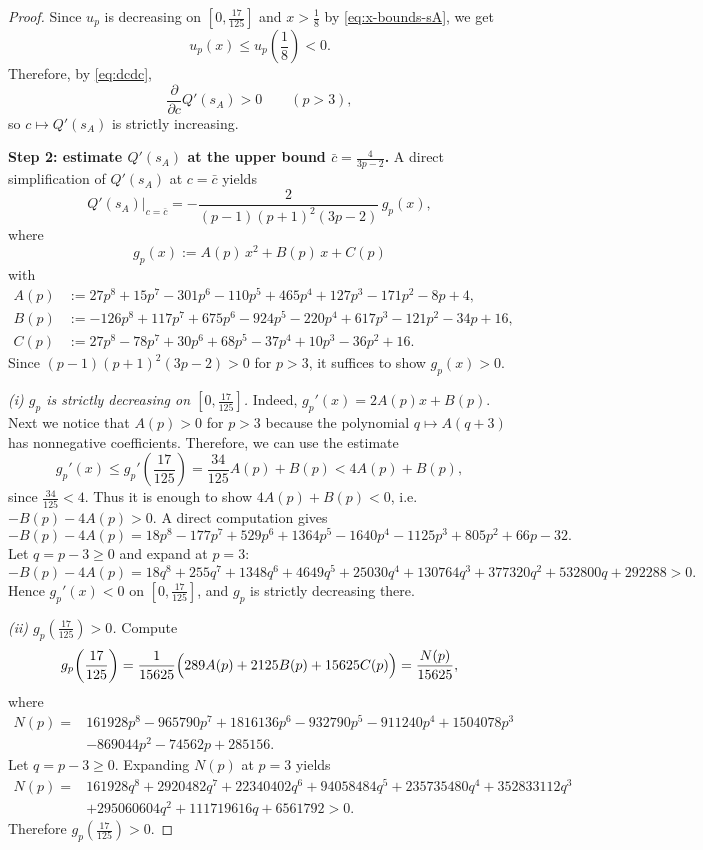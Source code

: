 \documentclass[11pt]{article}
\theoremstyle{definition}
\newcommand{\1}{\mathbf{1}}
\begin{document}
\begin{proof}
\smallskip
Since $u_p$ is decreasing on $[0,\frac{17}{125}]$ and $x>\frac18$ by \eqref{eq:x-bounds-sA}, we get
\[
u_p(x)\le u_p\!\left(\frac18\right)<0.
\]
Therefore, by \eqref{eq:dcdc},
\[
\frac{\partial}{\partial c}Q'(s_A)>0\qquad(p>3),
\]
so $c\mapsto Q'(s_A)$ is strictly increasing.

\medskip
\noindent\textbf{Step 2: estimate $Q'(s_A)$ at the upper bound $\bar c=\frac{4}{3p-2}$.}
A direct simplification of $Q'(s_A)$ at $c=\bar c$ yields
\begin{equation}\label{eq:Qprime-cbar}
Q'(s_A)\big|_{c=\bar c}
=
-\frac{2}{(p-1)(p+1)^2(3p-2)}\,g_p(x),
\end{equation}
where
\[
g_p(x):=A(p)\,x^2+B(p)\,x+C(p)
\]
with
\begin{align*}
A(p)&:=27p^8+15p^7-301p^6-110p^5+465p^4+127p^3-171p^2-8p+4,\\
B(p)&:=-126p^8+117p^7+675p^6-924p^5-220p^4+617p^3-121p^2-34p+16,\\
C(p)&:=27p^8-78p^7+30p^6+68p^5-37p^4+10p^3-36p^2+16.
\end{align*}
Since $(p-1)(p+1)^2(3p-2)>0$ for $p>3$, it suffices to show $g_p(x)>0$.

\smallskip
\emph{(i) $g_p$ is strictly decreasing on $[0,\frac{17}{125}]$.}
Indeed, $g_p'(x)=2A(p)x+B(p)$. Next we notice that $A(p)>0$ for $p>3$ because the polynomial $q \mapsto A(q+3)$ has nonnegative coefficients.  Therefore, we can use the estimate 
\[
g_p'(x)\le g_p'\!\left(\frac{17}{125}\right)
=\frac{34}{125}A(p)+B(p)
<4A(p)+B(p),
\]
since $\frac{34}{125}<4$.
Thus it is enough to show $4A(p)+B(p)<0$, i.e.\ $-B(p)-4A(p)>0$.
A direct computation gives
\[
-B(p)-4A(p)=18p^8-177p^7+529p^6+1364p^5-1640p^4-1125p^3+805p^2+66p-32.
\]
Let $q=p-3\ge0$ and expand at $p=3$:
\[
-B(p)-4A(p)=18q^8+255q^7+1348q^6+4649q^5+25030q^4+130764q^3+377320q^2+532800q+292288>0.
\]
Hence $g_p'(x)<0$ on $[0,\frac{17}{125}]$, and $g_p$ is strictly decreasing there.

\smallskip
\emph{(ii) $g_p(\frac{17}{125})>0$.}
Compute
\[
g_p\!\left(\frac{17}{125}\right)
=\frac{1}{15625}\Bigl(289A(p)+2125B(p)+15625C(p)\Bigr)
=\frac{N(p)}{15625},
\]
where
\begin{align*}
N(p)=&161928p^8-965790p^7+1816136p^6-932790p^5-911240p^4+1504078p^3\\
&-869044p^2-74562p+285156.
\end{align*}
Let $q=p-3\ge0$. Expanding $N(p)$ at $p=3$ yields
\begin{align*}
N(p)=&161928q^8+2920482q^7+22340402q^6+94058484q^5+235735480q^4
+352833112q^3\\
&+295060604q^2+111719616q+6561792>0.
\end{align*}
Therefore $g_p(\frac{17}{125})>0$.


\end{proof}
\end{document}
